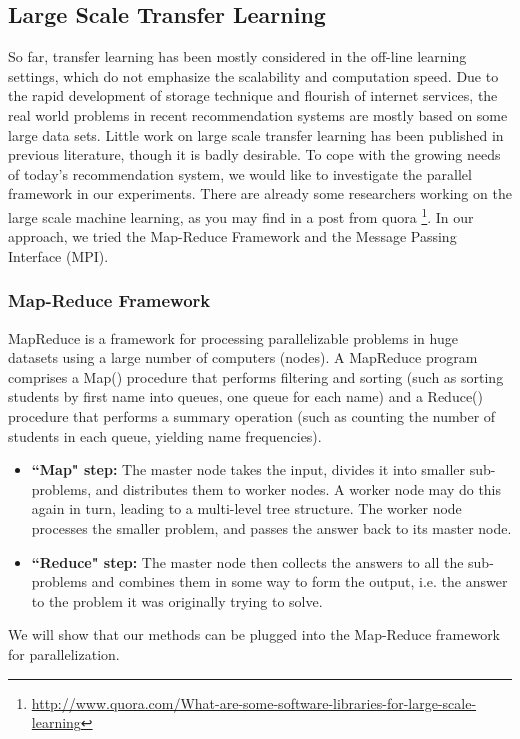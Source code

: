 \hspace{0.05in}
\subsection{Large Scale Transfer Learning}
So far, transfer learning has been mostly considered in the off-line learning settings, which do not emphasize the scalability and computation speed. Due to the rapid development of storage technique and flourish of internet services, the real world problems in recent recommendation systems are mostly based on some large data sets. Little work on large scale transfer learning has been published in previous literature, though it is badly desirable. To cope with the growing needs of today's recommendation system, we would like to investigate the parallel framework in our experiments. There are already some researchers working on the large scale machine learning, as you may find in a post from quora \footnote{\url{http://www.quora.com/What-are-some-software-libraries-for-large-scale-learning}}. In our approach, we tried the Map-Reduce Framework and the Message Passing Interface (MPI).

\hspace{0.02in}
\subsubsection{Map-Reduce Framework}
MapReduce is a framework for processing parallelizable problems in huge datasets using a large number of computers (nodes). A MapReduce program comprises a Map() procedure that performs filtering and sorting (such as sorting students by first name into queues, one queue for each name) and a Reduce() procedure that performs a summary operation (such as counting the number of students in each queue, yielding name frequencies).
\begin{itemize}
\item {\bf ``Map" step:} The master node takes the input, divides it into smaller sub-problems, and distributes them to worker nodes. A worker node may do this again in turn, leading to a multi-level tree structure. The worker node processes the smaller problem, and passes the answer back to its master node.
\item {\bf ``Reduce" step:} The master node then collects the answers to all the sub-problems and combines them in some way to form the output, i.e. the answer to the problem it was originally trying to solve.
\end{itemize}
We will show that our methods can be plugged into the Map-Reduce framework for parallelization.

